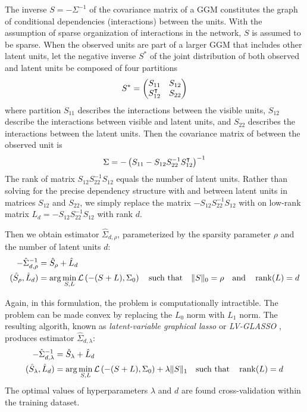 The inverse $S=-\Sigma^{-1}$ of the covariance matrix of a GGM constitutes the graph of conditional dependencies (interactions) between the units.  With the assumption of sparse organization of interactions in the network, $S$ is assumed to be sparse.  When the observed units are part of a larger GGM that includes other latent units, let the negative inverse $S^*$ of the joint distribution of both observed and latent units be composed of four partitions
\begin{equation}
S^* = 
\begin{pmatrix}
S_{11} & S_{12} \\
S_{12}^\intercal & S_{22} 
\end{pmatrix}
\end{equation}
where partition $S_{11}$ describes the interactions between the visible units, $S_{12}$ describe the interactions between visible and latent units, and $S_{22}$ describes the interactions between the latent units. 
Then the covariance matrix of between the observed unit is 
\begin{equation}
\Sigma = -\left(S_{11} - S_{12}S_{22}^{-1}S_{12}^\intercal\right)^{-1}
\end{equation} 
The rank of matrix $S_{12}S_{22}^{-1}S_{12}$ equals the number of latent units. Rather than solving for the precise dependency structure with and between latent units in matrices $S_{12}$ and $S_{22}$, we simply replace the matrix $- S_{12}S_{22}^{-1}S_{12}$ with on low-rank matrix $L_d=- S_{12}S_{22}^{-1}S_{12}$ with rank $d$.

Then we obtain estimator $\hat\Sigma_{d,\rho}$, parameterized by the sparsity parameter $\rho$ and  the number of latent units $d$:
\begin{equation}
\begin{split}
-\hat\Sigma_{d,\rho}^{-1} &= \hat S_\rho + \hat L_d
\\
(\hat S_\rho, \hat L_d) &= \arg\min\limits_{S,L} \mathcal L\left(-(S+L),\Sigma_0\right) \quad \mbox{such that} \quad \|S\|_0=\rho \quad \mbox{and} \quad \operatorname{rank}(L) = d
\end{split}
\end{equation}

Again, in this formulation, the problem is computationally intractible.  The problem can be made convex by replacing the $L_0$ norm with $L_1$ norm. The resulting algorith, known as \emph{latent-variable graphical lasso} or \emph{LV-GLASSO} \cite{Chandrasekaran:2010,Ma:2013}, produces estimator $\hat\Sigma_{d,\lambda}$:
\begin{equation}
\begin{split}
-\hat\Sigma_{d,\lambda}^{-1} &= \hat S_\lambda + \hat L_d
\\
(\hat S_\lambda, \hat L_d) &= \arg\min\limits_{S,L} \mathcal L\left(-(S+L),\Sigma_0\right) + \lambda \| S \|_1 \quad \mbox{such that}  \quad \operatorname{rank}(L) = d
\end{split}
\end{equation}
The optimal values of hyperparameters $\lambda$ and $d$ are found cross-validation within the training dataset.
